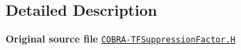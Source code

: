\subsection{Detailed Description}
{\bfseries Original source file} \href{../../../home/carlo/data/GeN-Foam/GeN-Foam_ffn/GeN-Foam/GeN-Foam/classes/thermalHydraulics/src/physicsModels/heatTransferModels/FSHeatTransferCoefficientModels/subModels/suppressionFactorModels/COBRA-TF/COBRA-TFSuppressionFactor.H}{\tt C\+O\+B\+R\+A-\/\+T\+F\+Suppression\+Factor.\+H} 